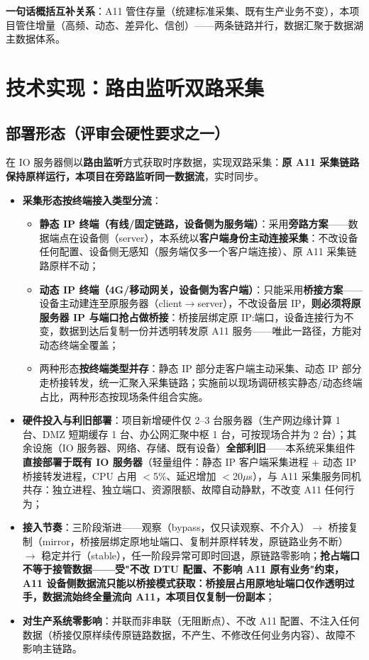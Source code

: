 \documentclass[11pt,a4paper]{ctexart}
\begin{document}
\textbf{一句话概括互补关系}：A11 管住存量（统建标准采集、既有生产业务不变），本项目管住增量（高频、动态、差异化、信创）——两条链路并行，数据汇聚于数据湖主数据体系。

\section{技术实现：路由监听双路采集}

\subsection{部署形态（评审会硬性要求之一）}

在 IO 服务器侧以\textbf{路由监听}方式获取时序数据，实现双路采集：\textbf{原 A11 采集链路保持原样运行，本项目在旁路监听同一数据流}，实时同步。

\begin{itemize}[leftmargin=*]
  \item \textbf{采集形态按终端接入类型分流}：
  \begin{itemize}
    \item \textbf{静态 IP 终端（有线/固定链路，设备侧为服务端）}：采用\textbf{旁路方案}——数据端点在设备侧（server），本系统以\textbf{客户端身份主动连接采集}：不改设备任何配置、设备侧无感知（服务端仅多一个客户端连接）、原 A11 采集链路原样不动；
    \item \textbf{动态 IP 终端（4G/移动网关，设备侧为客户端）}：只能采用\textbf{桥接方案}——设备主动建连至原服务器（client$\rightarrow$server），不改设备层 IP，\textbf{则必须将原服务器 IP 与端口抢占做桥接}：桥接层绑定原 IP:端口，设备连接行为不变，数据到达后复制一份并透明转发原 A11 服务——唯此一路径，方能对动态终端全覆盖；
    \item 两种形态\textbf{按终端类型并存}：静态 IP 部分走客户端主动采集、动态 IP 部分走桥接转发，统一汇聚入采集链路；实施前以现场调研核实静态/动态终端占比，两种形态按现场条件组合实施。
  \end{itemize}
  \item \textbf{硬件投入与利旧部署}：项目新增硬件仅 2--3 台服务器（生产网边缘计算 1 台、DMZ 短期缓存 1 台、办公网汇聚中枢 1 台，可按现场合并为 2 台）；其余设施（IO 服务器、网络、存储、既有设备）\textbf{全部利旧}——本系统采集组件\textbf{直接部署于既有 IO 服务器}（轻量组件：静态 IP 客户端采集进程 + 动态 IP 桥接转发进程，CPU 占用 $<$5\%、延迟增加 $<$20$\mu$s），与 A11 采集服务同机共存：独立进程、独立端口、资源限额、故障自动静默，不改变 A11 任何行为；
  \item \textbf{接入节奏}：三阶段渐进——观察（bypass，仅只读观察、不介入）$\rightarrow$ 桥接复制（mirror，桥接层绑定原地址端口、复制并原样转发，原链路业务不断）$\rightarrow$ 稳定并行（stable），任一阶段异常可即时回退，原链路零影响；\textbf{抢占端口不等于接管数据——受"不改 DTU 配置、不影响 A11 原有业务"约束，A11 设备侧数据流只能以桥接模式获取：桥接层占用原地址端口仅作透明过手，\textbf{数据流始终全量流向 A11}，本项目仅复制一份副本}；
  \item \textbf{对生产系统零影响}：并联而非串联（无阻断点）、不改 A11 配置、不注入任何数据（桥接仅原样续传原链路数据，不产生、不修改任何业务内容）、故障不影响主链路。
\end{itemize}
\end{document}
